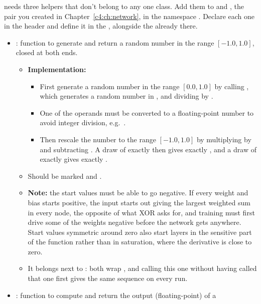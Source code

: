 \label{c5:ex:9}
 needs three helpers that don't belong to any one class. Add them to
 and , the pair you created in
Chapter~\ref{c4:ch:network}, in the namespace . Declare each one in the header and define
it in the , alongside the  already there.
\begin{itemize}
  \item {}: function to generate and return a random number in the range
    $[-1.0, 1.0]$, closed at both ends.
  \begin{itemize}
    \item \textbf{Implementation:}
    \begin{itemize}
      \item First generate a random number in the range $[0.0, 1.0]$ by calling
        , which generates a random number in , and dividing
        by .
      \item One of the operands must be converted to a floating-point number to avoid integer
        division, e.g.\ .
      \item Then rescale the number to the range $[-1.0, 1.0]$ by multiplying by  and
        subtracting . A draw of exactly  then gives exactly , and a
        draw of exactly  gives exactly .
    \end{itemize}
    \item Should be marked \code{[[nodiscard]]} and .
    \item \textbf{Note:} the start values must be able to go negative. If every weight and bias
      starts positive, the input  starts out giving the largest weighted sum in
      every node, the opposite of what XOR asks for, and training must first drive some of the
      weights negative before the network gets anywhere. Start values symmetric around zero also
      start  layers in the sensitive part of the function rather than in saturation,
      where the derivative is close to zero.
    \item It belongs next to : both wrap , and calling this
      one without having called that one first gives the same sequence on every run.
  \end{itemize}
  \item {}: function to compute and return the output (floating-point) of a

\end{itemize}

